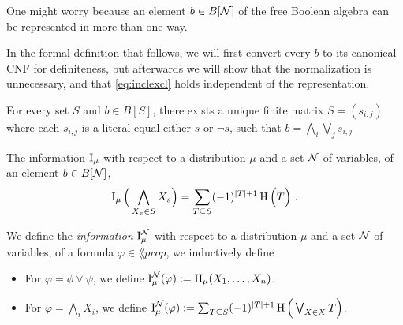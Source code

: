\documentclass[the-pdg-manual.tex]{subfiles}
\begin{document}
    One might worry because an element $b \in B[\mathcal N]$ of the free Boolean algebra can be represented in more than one way.

    \begin{inactive}
        In the formal definition that follows, we will first convert every $b$ to its canonical CNF for definiteness, but  afterwards we will show that the normalization is unnecessary, and that \eqref{eq:inclexcl} holds independent of the representation.

        \begin{fact}
            For every set $S$ and $b \in B[S]$, there exists a unique finite matrix $S = (s_{i,j})$ where each $s_{i,j}$ is a literal equal either $s$ or $\lnot s$, such that
            $\displaystyle b = \bigwedge_{i} \bigvee_{j} s_{i,j} $
        \end{fact}
        \begin{defn}
            The information $\operatorname{\mathrm{I}}_\mu$ with respect to a distribution $\mu$ and a set $\mathcal N$ of variables, of an element $b \in B[\mathcal N]$,
            \[          \operatorname{\mathrm{I}}_\mu\Big(\bigwedge_{X_x \in S} X_s\Big) =  \sum_{T \subseteq S} (-1)^{|T|+1} \operatorname{\mathrm{H}}\Big( T \Big) ~. \]
        \end{defn}
    \end{inactive}


\begin{defn}
    We define the \emph{information} $\operatorname{\mathrm{I}}_\mu^\mathcal N$ with respect to a distribution $\mu$ and a set $\mathcal N$ of variables, of a formula $\varphi \in \lang{prop}$, we inductively define
            \begin{itemize}[itemsep=0pt, parsep=1pt]
                \item For $\varphi = \phi \lor \psi$, we define $\operatorname{\mathrm{I}}^\mathcal N_\mu(\varphi) := \operatorname{\mathrm{H}}_\mu(X_1, \ldots, X_n)$.
                \item For $\varphi = \bigwedge_i X_i$, we define $\operatorname{\mathrm{I}}^\mathcal N_\mu(\varphi)
                     := \sum_{T \subseteq S} (-1)^{|T|+1} \operatorname{\mathrm{H}}\Big(\bigvee_{X \in X} T\Big)$.
            \end{itemize}
\end{defn}
\end{document}
